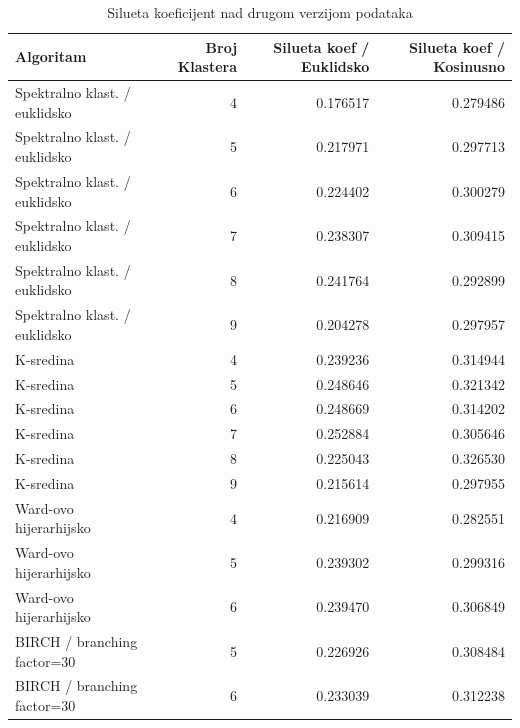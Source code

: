 \documentclass[a4paper]{article}
\begin{document}
\begin{center}
\begin{table}[H]
\caption{Silueta koeficijent nad drugom verzijom podataka}
\begin{adjustbox}{width=1\textwidth}
\begin{tabular}{lrrr}
\toprule
                     Algoritam &  Broj Klastera &  Silueta koef / Euklidsko &  Silueta koef / Kosinusno \\
\midrule
 Spektralno klast. / euklidsko &              4 &                  0.176517 &                  0.279486 \\
 Spektralno klast. / euklidsko &              5 &                  0.217971 &                  0.297713 \\
 Spektralno klast. / euklidsko &              6 &                  0.224402 &                  0.300279 \\
 Spektralno klast. / euklidsko &              7 &                  0.238307 &                  0.309415 \\
 Spektralno klast. / euklidsko &              8 &                  0.241764 &                  0.292899 \\
 Spektralno klast. / euklidsko &              9 &                  0.204278 &                  0.297957 \\
                     K-sredina &              4 &                  0.239236 &                  0.314944 \\
                     K-sredina &              5 &                  0.248646 &                  0.321342 \\
                     K-sredina &              6 &                  0.248669 &                  0.314202 \\
                     K-sredina &              7 &                  0.252884 &                  0.305646 \\
                     K-sredina &              8 &                  0.225043 &                  0.326530 \\
                     K-sredina &              9 &                  0.215614 &                  0.297955 \\
        Ward-ovo hijerarhijsko &              4 &                  0.216909 &                  0.282551 \\
        Ward-ovo hijerarhijsko &              5 &                  0.239302 &                  0.299316 \\
        Ward-ovo hijerarhijsko &              6 &                  0.239470 &                  0.306849 \\
        BIRCH / branching factor=30 &         5 &                  0.226926 &                  0.308484 \\
        BIRCH / branching factor=30 &         6 &                  0.233039 &                  0.312238 \\
\bottomrule
\end{tabular}
\end{adjustbox}
\label{grp1_v2_sil}
\end{table}
\end{center}
\end{document}
